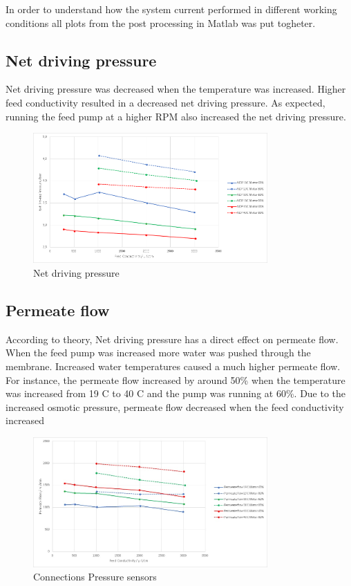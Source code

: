 \newpage

In order to understand how the system current performed in different working conditions all plots from the post processing in Matlab was put togheter. 

\subsection{Net driving pressure}

Net driving pressure was decreased when the temperature was increased. Higher feed conductivity resulted in a decreased net driving pressure. As expected, running the feed pump at a higher RPM also increased the net driving pressure.

\begin{figure}[H]
    \centering
    \includegraphics[width=0.8\textwidth]{NDP}
    \caption{Net driving pressure}
    \label{fig:PressConn}
\end{figure}

\subsection{Permeate flow}

According to theory, Net driving pressure has a direct effect on permeate flow. When the feed pump was increased more water was pushed through the membrane. Increased water temperatures caused a much higher permeate flow. For instance, the permeate flow increased by around 50\% when the temperature was increased from 19 C to 40 C and the pump was running at 60\%. Due to the increased osmotic pressure, permeate flow decreased when the feed conductivity increased

\begin{figure}[H]
    \centering
    \includegraphics[width=0.8\textwidth]{permFlowCurrent}
    \caption{Connections Pressure sensors}
    \label{fig:PressConn}
\end{figure}

